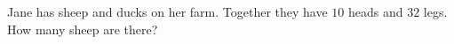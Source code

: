 Jane has sheep and ducks on her farm. Together they have $10$ heads and $32$ legs. How many sheep are there?
